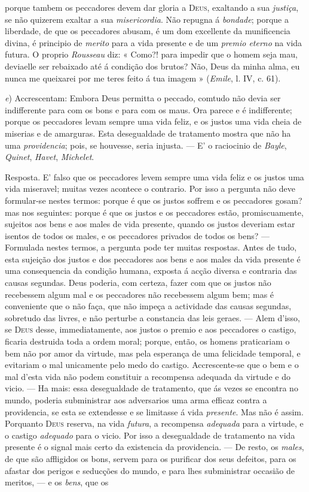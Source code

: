 porque tambem os peccadores devem dar gloria a \textsc{Deus}, exaltando a sua \emph{justiça}, se não quizerem exaltar a sua \emph{misericordia}. Não repugna á \emph{bondade}; porque a liberdade, de que os peccadores abusam, é um dom excellente da munificencia divina, é principio de \emph{merito} para a vida presente e de um \emph{premio eterno} na vida futura. O proprio \emph{Rousseau} diz: « Como?! para impedir que o homem seja mau, deviaelle ser rebaixado até á condição dos brutos? Não, Deus da minha alma, eu nunca me queixarei por me teres feito á tua imagem » (\emph{Emile}, l. IV, c. 61).\par \emph{e}) Accrescentam: Embora Deus permitta o peccado, comtudo não devia ser indifferente para com os bons e para com os maus. Ora parece e é indifferente; porque os peccadores levam sempre uma vida feliz, e os justos uma vida cheia de miserias e de amarguras. Esta desegualdade de tratamento mostra que não ha uma \emph{providencia}; pois, se houvesse, seria injusta. --- E' o raciocinio de \emph{Bayle}, \emph{Quinet}, \emph{Havet}, \emph{Michelet}.\par Resposta. E' falso que os peccadores levem sempre uma vida feliz e os justos uma vida miseravel; muitas vezes acontece o contrario. Por isso a pergunta não deve formular-se nestes termos: porque é que os justos soffrem e os peccadores gosam? mas nos seguintes: porque é que os justos e os peccadores estão, promiscuamente, sujeitos aos bens e aos males de vida presente, quando os justos deveriam estar isentos de todos os males, e os peccadores privados de todos os bens? --- Formulada nestes termos, a pergunta pode ter muitas respostas. Antes de tudo, esta sujeição dos justos e dos peccadores aos bens e aos males da vida presente é uma consequencia da condição humana, exposta á acção diversa e contraria das causas segundas. Deus poderia, com certeza, fazer com que os justos não recebessem algum mal e os peccadores não recebessem algum bem; mas é conveniente que o não faça, que não impeça a actividade das causas segundas, sobretudo das livres, e não perturbe a constancia das leis geraes. --- Alem d'isso, se \textsc{Deus} desse, immediatamente, aos justos o premio e aos peccadores o castigo, ficaria destruida toda a ordem moral; porque, então, os homens praticariam o bem não por amor da virtude, mas pela esperança de uma felicidade temporal, e evitariam o mal unicamente pelo medo do castigo. Accrescente-se que o bem e o mal d'esta vida não podem constituir a recompensa adequada da virtude e do vicio. --- Ha mais: essa desegualdade de tratamento, que ás vezes se encontra no mundo, poderia subministrar aos adversarios uma arma efficaz contra a providencia, se esta se extendesse e se limitasse á vida \emph{presente}. Mas não é assim. Porquanto \textsc{Deus} reserva, na vida \emph{futura}, a recompensa \emph{adequada} para a virtude, e o castigo \emph{adequado} para o vicio. Por isso a desegualdade de tratamento na vida presente é o signal mais certo da existencia da providencia. --- De resto, os \emph{males}, de que são affligidos os bons, servem para os purificar dos seus defeitos, para os afastar dos perigos e seducções do mundo, e para lhes subministrar occasião de meritos, --- e os \emph{bens}, que os 